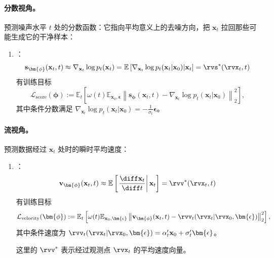 \paragraph{分数视角。} 预测噪声水平 $t$ 处的分数函数：它指向平均意义上的去噪方向，把 $\mathbf{x}_t$ 拉回那些可能生成它的干净样本：
\begin{enumerate}
    \item[3.]  \citep{song2019generative,song2020score}：
    \begin{equation}\label{eq:score-def}
        \mathbf{s}_{\bm{\phi}}(\mathbf{x}_t,t) \approx \nabla_{\mathbf{x}_t} \log p_t(\mathbf{x}_t) = \mathbb{E}\left[\nabla_{\mathbf{x}_t} \log p_t(\mathbf{x}_t|\mathbf{x}_0) |\mathbf{x}_t\right] = \rvs^*(\rvx_t, t)
    \end{equation}
    有训练目标
    \[
        \mathcal{L}_{\text{score}}(\bm{\phi}) := \mathbb{E}_t \left[\omega(t) \mathbb{E}_{\mathbf{x}_0, \bm{\epsilon}} \left\| \mathbf{s}_{\bm{\phi}}(\mathbf{x}_t,t) - \nabla_{\mathbf{x}_t} \log p_t(\mathbf{x}_t|\mathbf{x}_0) \right\|_2^2 \right],
    \]
    其中条件分数满足 $\nabla_{\mathbf{x}_t} \log p_t(\mathbf{x}_t|\mathbf{x}_0) = -\frac{1}{\sigma_t} \bm{\epsilon}$。
\end{enumerate}


\paragraph{流视角。} 预测数据经过 $\mathbf{x}_t$ 处时的瞬时平均速度：
\begin{enumerate}
    \item[4.]  \citep{lipman2022flow,liu2022rectified,salimans2021progressive,albergo2023stochastic}：
    \begin{equation}\label{eq:velocity-def}
        \mathbf{v}_{\bm{\phi}}(\mathbf{x}_t, t) \approx \mathbb{E}\left[\left. \frac{\diff  \mathbf{x}_t}{\diff  t} \right| {\mathbf{x}_t}\right] =\rvv^*(\rvx_t, t)
    \end{equation}
    有训练目标
    \[
        \mathcal{L}_{\text{velocity}}(\bm{\phi}) := \mathbb{E}_t \left[\omega(t) \mathbb{E}_{\mathbf{x}_0, \bm{\epsilon}} \left\| \mathbf{v}_{\bm{\phi}}(\mathbf{x}_t,t) - \rvv_t(\rvx_t | \rvx_0,\bm{\epsilon}) \right\|_2^2 \right],
    \]
    其中条件速度为 $\rvv_t(\rvx_t|\rvx_0,\bm{\epsilon}) = \alpha_t' \mathbf{x}_0 + \sigma_t' \bm{\epsilon}$。

这里的 $\rvv^*$ 表示经过观测点 $\rvx_t$ 的平均速度向量。
\end{enumerate}


